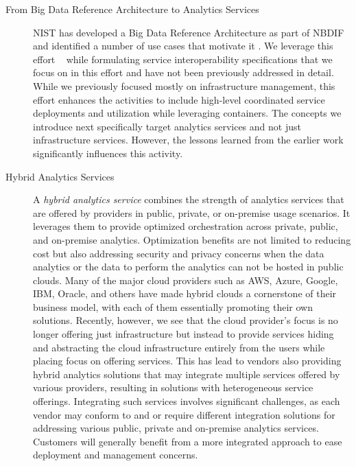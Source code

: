 \begin{description}

\item[From Big Data Reference Architecture to Analytics Services]
\label{s:arch}

NIST has developed a Big Data Reference Architecture as part of
NBDIF\cite{nist-v6} and identified a number of use cases that motivate
it \cite{nist-v3}. We leverage this effort
~\cite{nist-v1,nist-v2,nist-v3,nist-v4,nist-v5,nist-v6,nist-v7,nist-v8,nist-v9}
while formulating service interoperability specifications that we
focus on in this effort and have not been previously addressed in
detail. While we previously focused mostly on infrastructure
management, this effort enhances the activities to include high-level
coordinated service deployments and utilization while leveraging
containers. The concepts we introduce next specifically target analytics services and not just infrastructure services.
However, the lessons learned from the earlier work significantly
influences this activity.


\item[Hybrid Analytics Services]

A {\em hybrid analytics service} combines the strength of analytics
services that are offered by providers in public, private, or
on-premise usage scenarios. It leverages them to provide
optimized orchestration across private, public, and on-premise
analytics. Optimization benefits are not limited to reducing cost but
also addressing security and privacy concerns when the data analytics
or the data to perform the analytics can not be hosted in public
clouds. Many of the major cloud providers such as AWS, Azure, Google,
IBM, Oracle, and others have made hybrid clouds a cornerstone of their
business model, with each of them essentially promoting their own
solutions. Recently, however, we see that the cloud provider's focus
is no longer offering just infrastructure but instead to provide
services hiding and abstracting the cloud infrastructure entirely from
the users while placing focus on offering services. This has lead to
vendors also providing hybrid analytics solutions that may integrate
multiple services offered by various providers, resulting in solutions
with heterogeneous service offerings. Integrating such services
involves significant challenges, as each vendor may conform to and or
require different integration solutions for addressing various public,
private and on-premise analytics services. Customers will generally
benefit from a more integrated approach to ease deployment and
management concerns.


\end{description}
